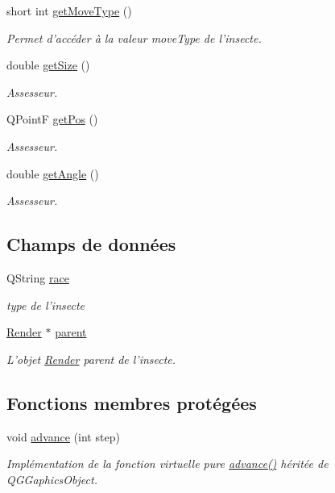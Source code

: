 \begin{DoxyCompactItemize}
short int \hyperlink{classBug_aced471cedcfa855baddf4c827003e755}{getMoveType} ()
\begin{DoxyCompactList}\small\item\em Permet d'accéder à la valeur moveType de l'insecte. \end{DoxyCompactList}\item 
double \hyperlink{classBug_ae29490347059f21518ff7162d0fbe9e5}{getSize} ()
\begin{DoxyCompactList}\small\item\em Assesseur. \end{DoxyCompactList}\item 
QPointF \hyperlink{classBug_a1c6d7743b87e9c4a85a58ea510c18526}{getPos} ()
\begin{DoxyCompactList}\small\item\em Assesseur. \end{DoxyCompactList}\item 
double \hyperlink{classBug_abd2246d752d1088b35e01d57d176ce5f}{getAngle} ()
\begin{DoxyCompactList}\small\item\em Assesseur. \end{DoxyCompactList}\end{DoxyCompactItemize}
\subsection*{Champs de données}
\begin{DoxyCompactItemize}
\item 
\hypertarget{classBug_a749053e5ac7cc0f6f43c39d99f7b99f8}{
QString \hyperlink{classBug_a749053e5ac7cc0f6f43c39d99f7b99f8}{race}}
\label{classBug_a749053e5ac7cc0f6f43c39d99f7b99f8}

\begin{DoxyCompactList}\small\item\em type de l'insecte \end{DoxyCompactList}\item 
\hyperlink{classRender}{Render} $\ast$ \hyperlink{classBug_a7a93aae4e4b7a215c94ff85d0bd6e26d}{parent}
\begin{DoxyCompactList}\small\item\em L'objet \hyperlink{classRender}{Render} parent de l'insecte. \end{DoxyCompactList}\end{DoxyCompactItemize}
\subsection*{Fonctions membres protégées}
\begin{DoxyCompactItemize}
\item 
void \hyperlink{classBug_a8e0ea03e85c9324a13328da60e5c52ee}{advance} (int step)
\begin{DoxyCompactList}\small\item\em Implémentation de la fonction virtuelle pure \hyperlink{classBug_a8e0ea03e85c9324a13328da60e5c52ee}{advance()} héritée de QGGaphicsObject. \end{DoxyCompactList}\end{DoxyCompactItemize}
